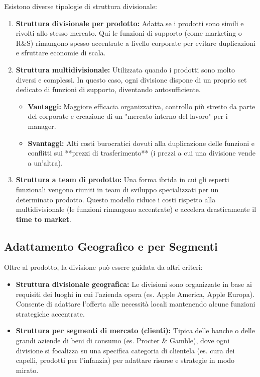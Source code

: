 \documentclass[a4paper,10pt]{article}
\begin{document}
Esistono diverse tipologie di struttura divisionale:
\begin{enumerate}
    \item \textbf{Struttura divisionale per prodotto:} Adatta se i prodotti sono simili e rivolti allo stesso mercato. Qui le funzioni di supporto (come marketing o R\&S) rimangono spesso accentrate a livello corporate per evitare duplicazioni e sfruttare economie di scala.
    \item \textbf{Struttura multidivisionale:} Utilizzata quando i prodotti sono molto diversi e complessi. In questo caso, ogni divisione dispone di un proprio set dedicato di funzioni di supporto, diventando autosufficiente. 
    \begin{itemize}
        \item \textbf{Vantaggi:} Maggiore efficacia organizzativa, controllo più stretto da parte del corporate e creazione di un "mercato interno del lavoro" per i manager.
        \item \textbf{Svantaggi:} Alti costi burocratici dovuti alla duplicazione delle funzioni e conflitti sui **prezzi di trasferimento** (i prezzi a cui una divisione vende a un'altra).
    \end{itemize}
    \item \textbf{Struttura a team di prodotto:} Una forma ibrida in cui gli esperti funzionali vengono riuniti in team di sviluppo specializzati per un determinato prodotto. Questo modello riduce i costi rispetto alla multidivisionale (le funzioni rimangono accentrate) e accelera drasticamente il \textbf{time to market}.
\end{enumerate}

\subsection*{Adattamento Geografico e per Segmenti}

Oltre al prodotto, la divisione può essere guidata da altri criteri:
\begin{itemize}
    \item \textbf{Struttura divisionale geografica:} Le divisioni sono organizzate in base ai requisiti dei luoghi in cui l'azienda opera (es. Apple America, Apple Europa). Consente di adattare l'offerta alle necessità locali mantenendo alcune funzioni strategiche accentrate.
    \item \textbf{Struttura per segmenti di mercato (clienti):} Tipica delle banche o delle grandi aziende di beni di consumo (es. Procter \& Gamble), dove ogni divisione si focalizza su una specifica categoria di clientela (es. cura dei capelli, prodotti per l'infanzia) per adattare risorse e strategie in modo mirato.
\end{itemize}
\end{document}
